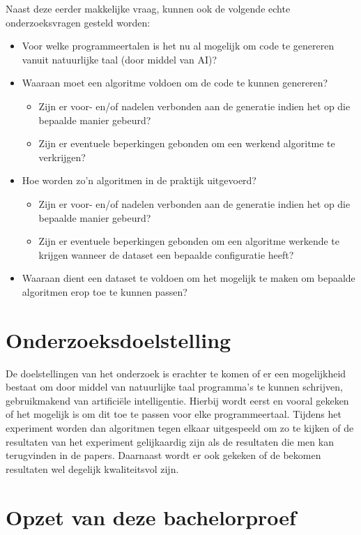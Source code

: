 Naast deze eerder makkelijke vraag, kunnen ook de volgende echte onderzoeksvragen gesteld worden:
\begin{itemize}
	\item Voor welke programmeertalen is het nu al mogelijk om code te genereren vanuit natuurlijke taal (door middel van AI)?
	\item Waaraan moet een algoritme voldoen om de code te kunnen genereren?
	\begin{itemize}
		\item Zijn er voor- en/of nadelen verbonden aan de generatie indien het op die bepaalde manier gebeurd?
		\item Zijn er eventuele beperkingen gebonden om een werkend algoritme te verkrijgen?
	\end{itemize}
	\item Hoe worden zo'n algoritmen in de praktijk uitgevoerd?
	\begin{itemize}
		\item Zijn er voor- en/of nadelen verbonden aan de generatie indien het op die bepaalde manier gebeurd?
		\item Zijn er eventuele beperkingen gebonden om een algoritme werkende te krijgen wanneer de dataset een bepaalde configuratie heeft?
	\end{itemize}
	\item Waaraan dient een dataset te voldoen om het mogelijk te maken om bepaalde algoritmen erop toe te kunnen passen?
\end{itemize}

\section{Onderzoeksdoelstelling}
\label{sec:onderzoeksdoelstelling}

De doelstellingen van het onderzoek is erachter te komen of er een mogelijkheid bestaat om door middel van natuurlijke taal programma's te kunnen schrijven, gebruikmakend van artificiële intelligentie. Hierbij wordt eerst en vooral gekeken of het mogelijk is om dit toe te passen voor elke programmeertaal. Tijdens het experiment worden dan algoritmen tegen elkaar uitgespeeld om zo te kijken of de resultaten van het experiment gelijkaardig zijn als de resultaten die men kan terugvinden in de papers. Daarnaast wordt er ook gekeken of de bekomen resultaten wel degelijk kwaliteitsvol zijn. 

\section{Opzet van deze bachelorproef}
\label{sec:opzet-bachelorproef}

